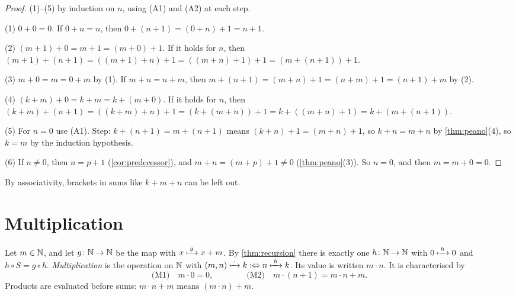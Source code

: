 \begin{proof}
(1)--(5) by induction on $n$, using (A1) and (A2) at each step.

(1) $0 + 0 = 0$. If $0 + n = n$, then $0 + (n + 1) = (0 + n) + 1 = n + 1$.

(2) $(m + 1) + 0 = m + 1 = (m + 0) + 1$. If it holds for $n$, then $(m + 1) + (n +
1) = ((m + 1) + n) + 1 = ((m + n) + 1) + 1 = (m + (n + 1)) + 1$.

(3) $m + 0 = m = 0 + m$ by (1). If $m + n = n + m$, then $m + (n + 1) = (m + n) + 1
= (n + m) + 1 = (n + 1) + m$ by (2).

(4) $(k + m) + 0 = k + m = k + (m + 0)$. If it holds for $n$, then $(k + m) + (n +
1) = ((k + m) + n) + 1 = (k + (m + n)) + 1 = k + ((m + n) + 1) = k + (m + (n +
1))$.

(5) For $n = 0$ use (A1). Step: $k + (n + 1) = m + (n + 1)$ means $(k + n) + 1 = (m
+ n) + 1$, so $k + n = m + n$ by \cref{thm:peano}(4), so $k = m$ by the induction
hypothesis.

(6) If $n \neq 0$, then $n = p + 1$ (\cref{cor:predecessor}), and $m + n = (m + p)
+ 1 \neq 0$ (\cref{thm:peano}(3)). So $n = 0$, and then $m = m + 0 = 0$.
\end{proof}

By associativity, brackets in sums like $k + m + n$ can be left out.

\section{Multiplication}

\begin{definition}[Multiplication]
\label{def:multiplication}
Let $m \in \mathbb{N}$, and let $g \colon \mathbb{N} \to \mathbb{N}$ be the map with $x \xmapsto{\;g\;} x + m$. By
\cref{thm:recursion} there is exactly one $h \colon \mathbb{N} \to \mathbb{N}$ with $0 \xmapsto{\;h\;} 0$
and $h \circ S = g \circ h$. \emph{Multiplication} is the operation on $\mathbb{N}$ with
$(m, n) \xmapsto{\;\cdot\;} k \mathrel{\vcentcolon\Leftrightarrow} n \xmapsto{\;h\;} k$. Its value is written $m \cdot n$. It
is characterised by
\[
  \text{(M1)}\quad m \cdot 0 = 0, \qquad\qquad \text{(M2)}\quad m \cdot (n + 1) = m
  \cdot n + m.
\]
Products are evaluated before sums: $m \cdot n + m$ means $(m \cdot n) + m$.
\end{definition}

